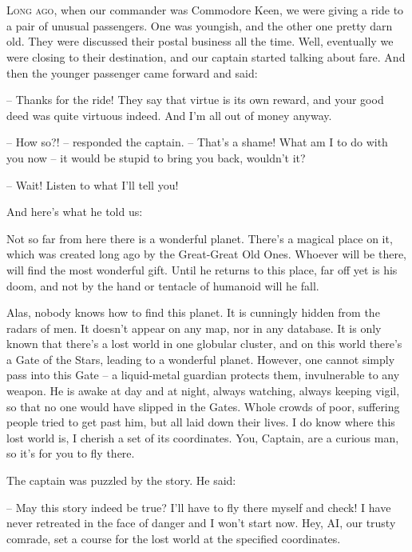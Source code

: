 \documentclass[ebook,twoside,final,openright]{memoir}
\begin{document}
\chapter{}
\par
\lettrine{L}{ong ago,} when our commander was Commodore Keen, we were giving a ride to a pair of unusual passengers. One was youngish, and the other one pretty darn old. They were discussed their postal business all the time. Well, eventually we were closing to their destination, and our captain started talking about fare. And then the younger passenger came forward and said: \par
\par
– Thanks for the ride! They say that virtue is its own reward, and your good deed was quite virtuous indeed. And I’m all out of money anyway.\par
– How so?! – responded the captain. – That's a shame! What am I to do with you now – it would be stupid to bring you back, wouldn’t it? \par
– Wait! Listen to what I’ll tell you! \par
 And here’s what he told us:\par
\par
Not so far from here there is a wonderful planet. There’s a magical place on it, which was created long ago by the Great-Great Old Ones. Whoever will be there, will find the most wonderful gift. Until he returns to this place, far off yet is his doom, and not by the hand or tentacle of humanoid will he fall. \par
Alas, nobody knows how to find this planet. It is cunningly hidden from the radars of men. It doesn’t appear on any map, nor in any database. It is only known that there’s a lost world in one globular cluster, and on this world there’s a Gate of the Stars, leading to a wonderful planet. However, one cannot simply pass into this Gate – a liquid-metal guardian protects them, invulnerable to any weapon. He is awake at day and at night, always watching, always keeping vigil, so that no one would have slipped in the Gates. Whole crowds of poor, suffering people tried to get past him, but all laid down their lives. I do know where this lost world is, I cherish a set of its coordinates. You, Captain, are a curious man, so it’s for you to fly there.\par
\par
The captain was puzzled by the story. He said:\par
– May this story indeed be true? I’ll have to fly there myself and check! I have never retreated in the face of danger and I won’t start now. Hey, AI, our trusty comrade, set a course for the lost world at the specified coordinates.\par
\end{document}
